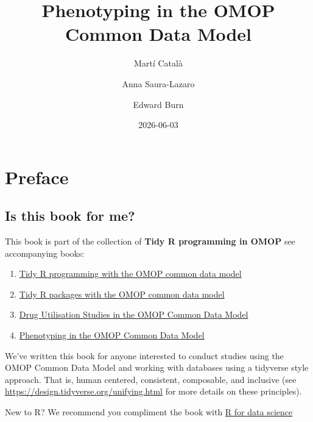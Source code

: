 \documentclass[
  letterpaper,
  oneside,
  open=any]{scrbook}
\title{Phenotyping in the OMOP Common Data Model}
\author{Martí Català \and Anna Saura-Lazaro \and Edward Burn}
\date{2026-06-03}
\providecommand{\tightlist}{%
  \setlength{\itemsep}{0pt}\setlength{\parskip}{0pt}}
\renewcommand*\contentsname{Table of contents}
\newcommand\contentsname{Table of contents}
\begin{document}
\frontmatter
\maketitle

\renewcommand*\contentsname{Table of contents}
{
\setcounter{tocdepth}{2}
\tableofcontents
}

\mainmatter
{}

\chapter*{Preface}\label{preface}


\section*{Is this book for me?}\label{is-this-book-for-me}


This book is part of the collection of \textbf{Tidy R programming in
OMOP} see accompanying books:

\begin{enumerate}
\def\labelenumi{(\arabic{enumi})}
\tightlist
\item
  \href{https://oxford-pharmacoepi.github.io/Tidy-R-programming-with-OMOP/}{Tidy
  R programming with the OMOP common data model}
\item
  \href{https://oxford-pharmacoepi.github.io/Tidy-R-packages-with-OMOP/}{Tidy
  R packages with the OMOP common data model}
\item
  \href{https://oxford-pharmacoepi.github.io/DrugUtilisation-in-OMOP-CDM/}{Drug
  Utilisation Studies in the OMOP Common Data Model}
\item
  \href{https://oxford-pharmacoepi.github.io/Phenotyping-in-OMOP/}{Phenotyping
  in the OMOP Common Data Model}
\end{enumerate}

We've written this book for anyone interested to conduct studies using
the OMOP Common Data Model and working with databases using a tidyverse
style approach. That is, human centered, consistent, composable, and
inclusive (see \url{https://design.tidyverse.org/unifying.html} for more
details on these principles).

New to R? We recommend you compliment the book with
\href{https://r4ds.had.co.nz/}{R for data science}
\end{document}
